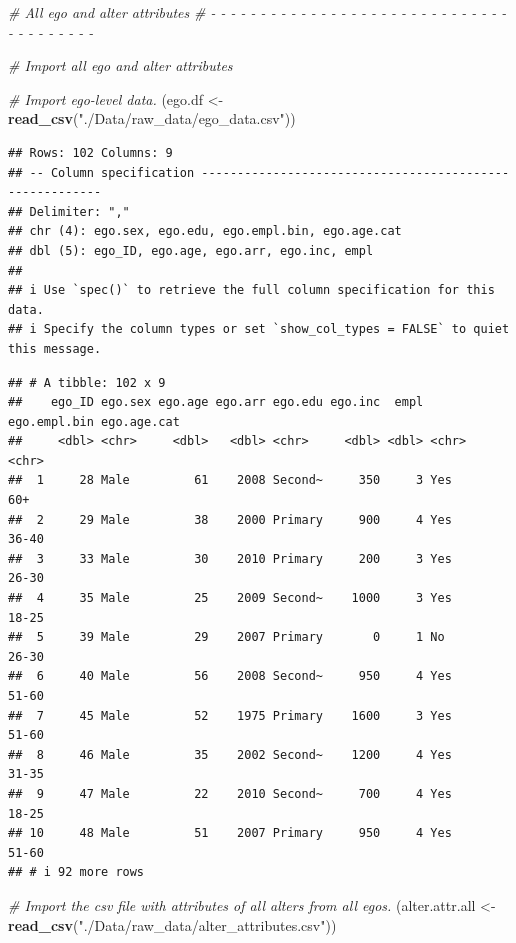 \documentclass[
]{book}
\newenvironment{Shaded}{\begin{snugshade}}{\end{snugshade}}
\newcommand{\CommentTok}[1]{\textcolor[rgb]{0.56,0.35,0.01}{\textit{#1}}}
\newcommand{\FunctionTok}[1]{\textcolor[rgb]{0.13,0.29,0.53}{\textbf{#1}}}
\newcommand{\NormalTok}[1]{#1}
\newcommand{\OtherTok}[1]{\textcolor[rgb]{0.56,0.35,0.01}{#1}}
\newcommand{\StringTok}[1]{\textcolor[rgb]{0.31,0.60,0.02}{#1}}
\begin{document}
\begin{Shaded}
\begin{Highlighting}[]
\CommentTok{\# All ego and alter attributes}
\CommentTok{\# {-} {-} {-} {-} {-} {-} {-} {-} {-} {-} {-} {-} {-} {-} {-} {-} {-} {-} {-} {-} {-} {-} {-} {-} {-} {-} {-} {-} {-} {-} {-} {-} {-} {-} {-} {-} {-} {-} {-} }

\CommentTok{\# Import all ego and alter attributes}

\CommentTok{\# Import ego{-}level data.}
\NormalTok{(ego.df }\OtherTok{\textless{}{-}} \FunctionTok{read\_csv}\NormalTok{(}\StringTok{"./Data/raw\_data/ego\_data.csv"}\NormalTok{))}
\end{Highlighting}
\end{Shaded}

\begin{verbatim}
## Rows: 102 Columns: 9
## -- Column specification --------------------------------------------------------
## Delimiter: ","
## chr (4): ego.sex, ego.edu, ego.empl.bin, ego.age.cat
## dbl (5): ego_ID, ego.age, ego.arr, ego.inc, empl
## 
## i Use `spec()` to retrieve the full column specification for this data.
## i Specify the column types or set `show_col_types = FALSE` to quiet this message.
\end{verbatim}

\begin{verbatim}
## # A tibble: 102 x 9
##    ego_ID ego.sex ego.age ego.arr ego.edu ego.inc  empl ego.empl.bin ego.age.cat
##     <dbl> <chr>     <dbl>   <dbl> <chr>     <dbl> <dbl> <chr>        <chr>      
##  1     28 Male         61    2008 Second~     350     3 Yes          60+        
##  2     29 Male         38    2000 Primary     900     4 Yes          36-40      
##  3     33 Male         30    2010 Primary     200     3 Yes          26-30      
##  4     35 Male         25    2009 Second~    1000     3 Yes          18-25      
##  5     39 Male         29    2007 Primary       0     1 No           26-30      
##  6     40 Male         56    2008 Second~     950     4 Yes          51-60      
##  7     45 Male         52    1975 Primary    1600     3 Yes          51-60      
##  8     46 Male         35    2002 Second~    1200     4 Yes          31-35      
##  9     47 Male         22    2010 Second~     700     4 Yes          18-25      
## 10     48 Male         51    2007 Primary     950     4 Yes          51-60      
## # i 92 more rows
\end{verbatim}

\begin{Shaded}
\begin{Highlighting}[]
\CommentTok{\# Import the csv file with attributes of all alters from all egos.}
\NormalTok{(alter.attr.all }\OtherTok{\textless{}{-}} \FunctionTok{read\_csv}\NormalTok{(}\StringTok{"./Data/raw\_data/alter\_attributes.csv"}\NormalTok{))}
\end{Highlighting}
\end{Shaded}
\end{document}
